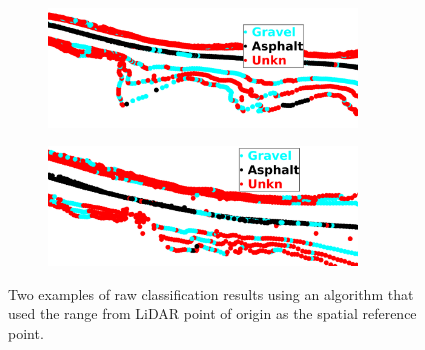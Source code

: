 \documentclass[numbered,pdftex]{ohio-etd}
\begin{document}
{{		%
		\begin{figure}[H]
			\centering
			\begin{subfigure}[b]{\textwidth}
				\centering
				\includegraphics[width=0.9\textwidth]{Defense_Images/db_4_raw_range}
				\caption{}
				\label{fig:db_4_raw_range}
			\end{subfigure}
			\vspace{1cm} %
			\begin{subfigure}[b]{\textwidth}
				\centering
				\includegraphics[width=0.9\textwidth]{Defense_Images/db_6_raw_range}
				\caption{}
				\label{fig:db_6_raw_range}
			\end{subfigure}
			\caption[Raw Result Example - RANGE Spatial Reference Point]{Two examples of raw classification results using an algorithm that used the range from LiDAR point of origin as the spatial reference point. }
			\label{fig:range_raw_results_example}
		\end{figure}
		

}}
\end{document}
